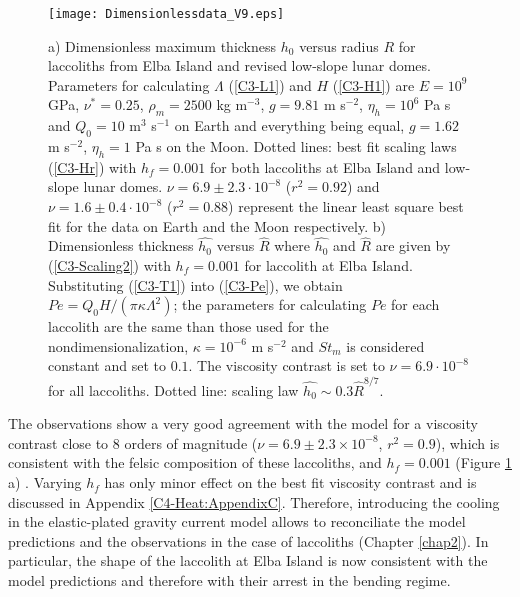 \begin{figure}[h!]
  \begin{center}
    \graphicspath{ {/Users/thorey/Documents/These/Projet/Refroidissement/Skin_Model/Figure/Figure_Heating/} }
    \texttt{[image: Dimensionlessdata\_V9.eps]}
    \caption{a)  Dimensionless maximum  thickness $h_0$  versus radius
      $R$ for laccoliths from Elba  Island and revised low-slope lunar
      domes.  Parameters  for calculating $\Lambda$  (\ref{C3-L1}) and
      $H$    (\ref{C3-H1})    are    $E=10^9$    GPa,    $\nu^*=0.25$,
      $\rho_m = 2500$ kg m$^{-3}$, $g=9.81$ m s$^{-2}$, $\eta_h =10^6$
      Pa s and $Q_0 = 10$ m$^3$ s$^{-1}$ on Earth and everything being
      equal, $g=1.62$ m s$^{-2}$, $\eta_h =1$ Pa s on the Moon. Dotted
      lines: best  fit scaling laws  (\ref{C3-Hr}) with $h_f  = 0.001$
      for both  laccoliths at Elba  Island and low-slope  lunar domes.
      $\nu   =   6.9\pm   2.3    \cdot   10^{-8}$   ($r^2=0.92$)   and
      $\nu  = 1.6\pm  0.4  \cdot 10^{-8}$  ($r^2=0.88$) represent  the
      linear least square best fit for  the data on Earth and the Moon
      respectively.   b)  Dimensionless thickness  $\hat{h_0}$  versus
      $\hat{R}$  where   $\hat{h_0}$  and   $\hat{R}$  are   given  by
      (\ref{C3-Scaling2})  with  $h_f=0.001$  for  laccolith  at  Elba
      Island.   Substituting  (\ref{C3-T1})   into  (\ref{C3-Pe}),  we
      obtain $Pe = Q_0 H  /(\pi \kappa \Lambda^2)$; the parameters for
      calculating $Pe$ for each laccolith are the same than those used
      for the  nondimensionalization, $\kappa=10^{-6}$ m  s$^{-2}$ and
      $St_m$ is considered  constant and set to  $0.1$.  The viscosity
      contrast is set  to $\nu =6.9\cdot 10^{-8}$  for all laccoliths.
      Dotted line: scaling law $ \hat{h_0} \sim 0.3\hat{R}^{8/7}$.}
    \label{C4-Data}
  \end{center}
\end{figure}

The  observations show  a very  good agreement  with the  model for  a
viscosity    contrast   close    to    $8$    orders   of    magnitude
($\nu =  6.9\pm 2.3 \times  10^{-8}$, $r^2=0.9$), which  is consistent
with  the  felsic composition  of  these  laccoliths, and  $h_f=0.001$
(Figure \ref{C4-Data} a) \citep{Marsh:1981dc,Diniega:2013eh}.  Varying
$h_f$ has only minor effect on  the best fit viscosity contrast and is
discussed in Appendix \ref{C4-Heat:AppendixC}.  Therefore, introducing
the  cooling in  the elastic-plated  gravity current  model allows  to
reconciliate the model predictions and the observations in the case of
laccoliths  (Chapter \ref{chap2}).   In particular,  the shape  of the
laccolith at Elba Island is  now consistent with the model predictions
and therefore with their arrest in the bending regime.

